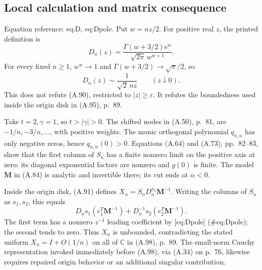 \documentclass[10pt]{article}
\begin{document}
\subsection*{Local calculation and matrix consequence}
Equation reference: eq:D, eq:Dpole. Put \(w=nz/2\). For positive real \(z\), the printed definition is \[
 D_n(z)=\frac{\Gamma(w+3/2)e^w}
              {\sqrt{2\pi}\,w^{w+1}}.\] For every fixed \(n\ge1\), \(w^w\to1\) and \(\Gamma(w+3/2)\to\sqrt\pi/2\), so \[
 D_n(z)\sim\frac{1}{\sqrt2\,nz}\qquad(z\downarrow0).\] This does not refute (A.90), restricted to \(|z|\ge\varepsilon\). It refutes the boundedness used inside the origin disk in (A.95), p. 89.\par
Take \(t=2,\gamma=1\), so \(t>|\gamma|>0\). The shifted nodes in (A.50), p. 81, are \(-1/n,-3/n,\ldots\), with positive weights. The monic orthogonal polynomial \(q_{n,n}\) has only negative zeros, hence \(q_{n,n}(0)>0\). Equations (A.64) and (A.73), pp. 82–83, show that the first column of \(S_n\) has a finite nonzero limit on the positive axis at zero: its diagonal exponential factors are nonzero and \(g(0)\) is finite. The model \(\mathbf M\) in (A.84) is analytic and invertible there; its cut ends at \(\alpha<0\).\par
Inside the origin disk, (A.91) defines \(X_n=S_nD_n^{\sigma_3}\mathbf M^{-1}\). Writing the columns of \(S_n\) as \(s_1,s_2\), this equals \[D_n s_1(e_1^T\mathbf M^{-1})
 +D_n^{-1}s_2(e_2^T\mathbf M^{-1}).\] The first term has a nonzero \(z^{-1}\) leading coefficient by [eq:Dpole] (\#eq:Dpole); the second tends to zero. Thus \(X_n\) is unbounded, contradicting the stated uniform \(X_n=I+O(1/n)\) on all of \(\mathbb C\) in (A.98), p. 89. The small-norm Cauchy representation invoked immediately before (A.98), via (A.34) on p. 76, likewise requires repaired origin behavior or an additional singular contribution.\par
\end{document}
